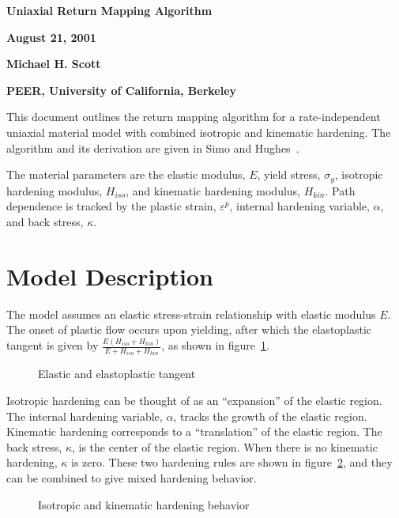 \documentclass[12pt]{article}
\begin{document}
\begin{center}
{\bf \Large Uniaxial Return Mapping Algorithm}

{\bf August 21, 2001} 

{\bf Michael H. Scott} 

{\bf PEER, University of California, Berkeley}
\end{center}

This document outlines the return mapping algorithm for a rate-independent
uniaxial material
model with combined isotropic and kinematic hardening. The algorithm and its
derivation are given in Simo and Hughes~\cite{Simo:1998}.

The material parameters are the elastic modulus, $E$, yield stress,
$\sigma_y$, isotropic hardening modulus, $H_{iso}$, and kinematic hardening
modulus, $H_{kin}$. Path dependence is tracked by the plastic strain,
$\varepsilon^p$, internal hardening variable, $\alpha$, and back
stress, $\kappa$.

\section*{Model Description}
The model assumes an elastic stress-strain relationship with elastic modulus $E$.
The onset of plastic flow occurs upon yielding, after which the elastoplastic
tangent is given by $\frac{E(H_{iso}+H_{kin})}{E+H_{iso}+H_{kin}}$, as shown
in figure~\ref{fig:StressStrain}.

\begin{figure}[htpb]
\begin{center}

\end{center}
\caption{Elastic and elastoplastic tangent}
\label{fig:StressStrain}
\end{figure}

Isotropic hardening can be thought of as an ``expansion'' of the elastic region.
The internal hardening variable, $\alpha$, tracks the growth of the elastic
region.
Kinematic hardening corresponds to a ``translation'' of the elastic region.
The back stress, $\kappa$, is the center of the elastic region. When there is
no kinematic hardening, $\kappa$ is zero.
These two hardening rules are shown in figure~\ref{fig:HardeningBehavior}, and
they can be combined to give mixed hardening behavior.

\begin{figure}[htpb]
\begin{center}

\end{center}
\caption{Isotropic and kinematic hardening behavior}
\label{fig:HardeningBehavior}
\end{figure}
\end{document}

